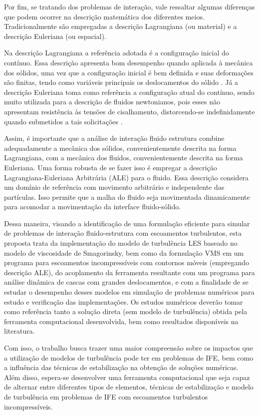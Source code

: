 Por fim, se tratando dos problemas de interação, vale ressaltar algumas diferenças que podem ocorrer na descrição matemática dos diferentes meios. Tradicionalmente são empregadas a descrição Lagrangiana (ou material) e a descrição Euleriana (ou espacial).

Na descrição Lagrangiana a referência adotada é a configuração inicial do contínuo. Essa descrição apresenta bom desempenho quando aplicada à mecânica dos sólidos, uma vez que a configuração inicial é bem definida e suas deformações são finitas, tendo como variáveis principais os deslocamentos do sólido \cite{sanches2014fluid, fernandes2019ale}. Já a descrição Euleriana toma como referência a configuração atual do contínuo, sendo muito utilizada para a descrição de fluidos newtonianos, pois esses não apresentam resistência às tensões de cisalhamento, distorcendo-se indefinidamente quando submetidos a tais solicitações \cite{sanches2014fluid, fernandes2019ale}.

Assim, é importante que a análise de interação fluido estrutura combine adequadamente a mecânica dos sólidos, convenientemente descrita na forma Lagrangiana, com a mecânica dos fluidos, convenientemente descrita na forma Euleriana. Uma forma robusta de se fazer isso é empregar a descrição Lagrangiana-Euleriana Arbitrária (ALE) \cite{donea1982arbitrary} para o fluido. Essa descrição considera um domínio de referência com movimento arbitrário e independente das partículas. Isso permite que a malha do fluido seja movimentada dinamicamente para acomodar a movimentação da interface fluido-sólido.

Dessa maneira, visando a identificação de uma formulação eficiente para simular de problemas de interação fluido-estrutura com escoamentos turbulentos, esta proposta trata da implementação do modelo de turbulência LES baseado no modelo de viscosidade de Smagorinsky, bem como da formulação VMS em um programa para escoamentos incompressíveis com contornos móveis (empregando descrição ALE), do acoplamento da ferramenta resultante com um programa para análise dinâmica de cascas com grandes deslocamentos, e com a finalidade de se estudar o desempenho desses modelos em simulação de problemas numéricos para estudo e verificação das implementações. Os estudos numéricos deverão tomar como referência tanto a solução direta (sem modelo de turbulência) obtida pela ferramenta computacional desenvolvida, bem como resultados disponíveis na literatura.

Com isso, o trabalho busca trazer uma maior compreensão sobre os impactos que a utilização de modelos de turbulência pode ter em problemas de IFE, bem como a influência das técnicas de estabilização na obtenção de soluções numéricas. Além disso, espera-se desenvolver uma ferramenta computacional que seja capaz de alternar entre diferentes tipos de elementos, técnicas de estabilização e modelo de turbulência em problemas de IFE com escoamentos turbulentos incompressíveis.

